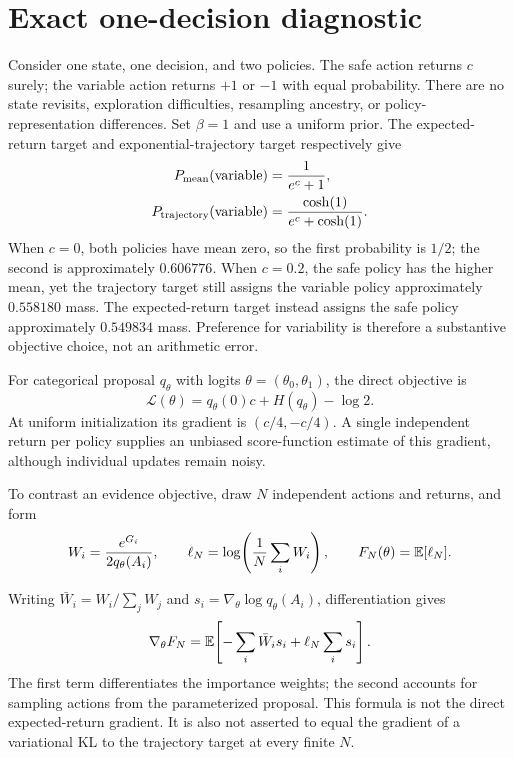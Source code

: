 \section{Exact one-decision diagnostic}
\label{app:noise-objective}

Consider one state, one decision, and two policies. The safe action returns
$c$ surely; the variable action returns $+1$ or $-1$ with equal probability.
There are no state revisits, exploration difficulties, resampling ancestry,
or policy-representation differences. Set $\beta=1$ and use a uniform prior.
The expected-return target and exponential-trajectory target respectively give
\begin{align}
 P_{\rm mean}(\text{variable})
   &=\frac{1}{e^c+1}, \\
 P_{\rm trajectory}(\text{variable})
   &=\frac{\cosh(1)}{e^c+\cosh(1)}.
 \label{eq:noise-targets}
\end{align}
When $c=0$, both policies have mean zero, so the first probability is $1/2$;
the second is approximately $0.606776$. When $c=0.2$, the safe policy has the
higher mean, yet the trajectory target still assigns the variable policy
approximately $0.558180$ mass. The expected-return target instead assigns
the safe policy approximately $0.549834$ mass. Preference for variability is
therefore a substantive objective choice, not an arithmetic error.

For categorical proposal $q_\theta$ with logits $\theta=(\theta_0,\theta_1)$,
the direct objective is
\[
 \mathcal L(\theta)=q_\theta(0)c+H(q_\theta)-\log2.
\]
At uniform initialization its gradient is $(c/4,-c/4)$. A single independent
return per policy supplies an unbiased score-function estimate of this
gradient, although individual updates remain noisy.

\begin{samepage}
To contrast an evidence objective, draw $N$ independent actions and returns,
and form
\[
 W_i=\frac{e^{G_i}}{2q_\theta(A_i)},\qquad
 \ell_N=\log\!\left(\frac1N\sum_iW_i\right),\qquad
 F_N(\theta)=\mathbb{E}[\ell_N].
\]
\end{samepage}
Writing $\bar W_i=W_i/\sum_jW_j$ and
$s_i=\nabla_\theta\log q_\theta(A_i)$, differentiation gives
\begin{equation}
 \nabla_\theta F_N
 =\mathbb{E}\!\left[-\sum_i\bar W_i s_i+\ell_N\sum_i s_i\right].
 \label{eq:noise-evidence-gradient}
\end{equation}
The first term differentiates the importance weights; the second accounts
for sampling actions from the parameterized proposal. This formula is not
the direct expected-return gradient. It is also not asserted to equal the
gradient of a variational KL to the trajectory target at every finite $N$.

